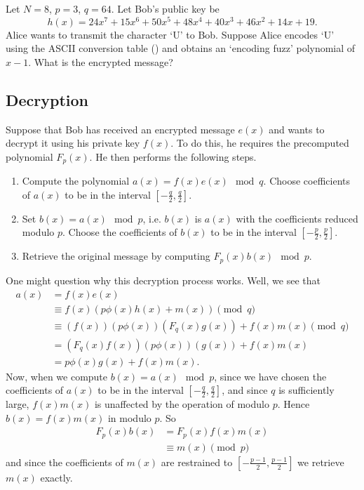 \begin{exercise}
    Let $N = 8$, $p = 3$, $q = 64$. Let Bob's public key be
    \[
        h(x) = 24x^7 + 15x^6 + 50x^5 + 48x^4 + 40x^3 + 46x^2 + 14x + 19.
    \]
    Alice wants to transmit the character `U' to Bob. Suppose Alice encodes `U' using the ASCII conversion table () and obtains an `encoding fuzz' polynomial of $x - 1$. What is the encrypted message?
\end{exercise}

\subsection{Decryption}
Suppose that Bob has received an encrypted message $e(x)$ and wants to decrypt it using his private key $f(x)$. To do this, he requires the precomputed polynomial $F_p(x)$. He then performs the following steps.
\begin{enumerate}
    \item Compute the polynomial $a(x) = f(x)e(x) \mod q$. Choose coefficients of $a(x)$ to be in the interval $\left[-\frac q2, \frac q2\right]$.
    \item Set $b(x) = a(x) \mod p$, i.e. $b(x)$ is $a(x)$ with the coefficients reduced modulo $p$. Choose the coefficients of $b(x)$ to be in the interval $\left[-\frac p2, \frac p2\right]$.
    \item Retrieve the original message by computing $F_p(x)b(x) \mod p$.
\end{enumerate}

One might question why this decryption process works. Well, we see that
\begin{align*}
    a(x) &= f(x)e(x)\\
    &\equiv f(x) \left(p\phi(x)h(x) + m(x)\right) \pmod q\\
    &\equiv (f(x))(p\phi(x))(F_q(x)g(x)) + f(x)m(x) \pmod q\\
    &= (F_q(x)f(x))(p\phi(x))(g(x)) + f(x)m(x)\\
    &= p\phi(x)g(x) + f(x)m(x).
\end{align*}
Now, when we compute $b(x) = a(x) \mod p$, since we have chosen the coefficients of $a(x)$ to be in the interval $\left[-\frac q2, \frac q2\right]$, and since $q$ is sufficiently large, $f(x)m(x)$ is unaffected by the operation of modulo $p$. Hence $b(x) = f(x)m(x)$ in modulo $p$. So
\begin{align*}
    F_p(x)b(x) &= F_p(x)f(x)m(x)\\
    &\equiv m(x) \pmod{p}
\end{align*}
and since the coefficients of $m(x)$ are restrained to $\left[-\frac{p-1}2, \frac{p-1}2\right]$ we retrieve $m(x)$ exactly.

